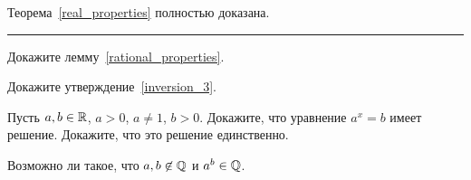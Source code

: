 \documentclass[a4paper,12pt,fleqn]{article}
\begin{document}
Теорема~\ref{real_properties} полностью доказана.

\bigskip
\hrule
\bigskip

Докажите лемму~\ref{rational_properties}.

Докажите утверждение~\ref{inversion_3}.

Пусть $a,b \in \mathbb{R}$, $a > 0$, $a \ne 1$, $b > 0$. 
Докажите, что уравнение $a^x = b$ имеет решение.
Докажите, что это решение единственно.

Возможно ли такое, что $a, b \not\in \mathbb{Q}$ и $a^b \in \mathbb{Q}$.
\end{document}
